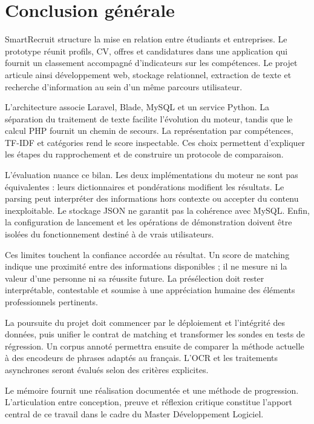 \chapter*{Conclusion générale}
SmartRecruit structure la mise en relation entre étudiants et entreprises. Le prototype réunit profils, CV, offres et candidatures dans une application qui fournit un classement accompagné d'indicateurs sur les compétences. Le projet articule ainsi développement web, stockage relationnel, extraction de texte et recherche d'information au sein d'un même parcours utilisateur.

L'architecture associe Laravel, Blade, MySQL et un service Python. La séparation du traitement de texte facilite l'évolution du moteur, tandis que le calcul PHP fournit un chemin de secours. La représentation par compétences, TF-IDF et catégories rend le score inspectable. Ces choix permettent d'expliquer les étapes du rapprochement et de construire un protocole de comparaison.

L'évaluation nuance ce bilan. Les deux implémentations du moteur ne sont pas équivalentes : leurs dictionnaires et pondérations modifient les résultats. Le parsing peut interpréter des informations hors contexte ou accepter du contenu inexploitable. Le stockage JSON ne garantit pas la cohérence avec MySQL. Enfin, la configuration de lancement et les opérations de démonstration doivent être isolées du fonctionnement destiné à de vrais utilisateurs.

Ces limites touchent la confiance accordée au résultat. Un score de matching indique une proximité entre des informations disponibles ; il ne mesure ni la valeur d'une personne ni sa réussite future. La présélection doit rester interprétable, contestable et soumise à une appréciation humaine des éléments professionnels pertinents.

La poursuite du projet doit commencer par le déploiement et l'intégrité des données, puis unifier le contrat de matching et transformer les sondes en tests de régression. Un corpus annoté permettra ensuite de comparer la méthode actuelle à des encodeurs de phrases adaptés au français. L'OCR et les traitements asynchrones seront évalués selon des critères explicites.

Le mémoire fournit une réalisation documentée et une méthode de progression. L'articulation entre conception, preuve et réflexion critique constitue l'apport central de ce travail dans le cadre du Master Développement Logiciel.
